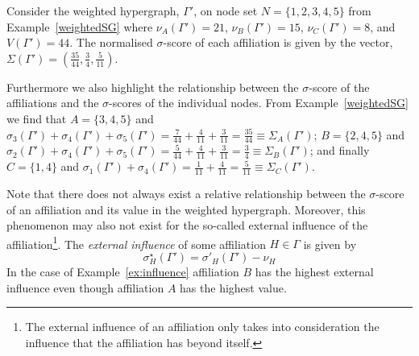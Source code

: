 \begin{example} \label{ex:influence}
Consider the weighted hypergraph, $\Gamma '$, on node set $N = \{ 1, 2, 3, 4, 5\}$ from Example~\ref{weightedSG} where $\nu_{A}(\Gamma' ) = 21$, $\nu_{B}(\Gamma' ) = 15$, $\nu_{C}(\Gamma' ) = 8$, and $V (\Gamma' ) = 44$. The normalised $\sigma$-score of each affiliation is given by the vector, $\Sigma(\Gamma' ) = ( \frac{35}{44}, \frac{3}{4}, \frac{5}{11} )$.

Furthermore we also highlight the relationship between the $\sigma$-score of the affiliations and the $\sigma$-scores of the individual nodes. From Example~\ref{weightedSG} we find that $A = \{3,4,5\}$ and $\sigma_{3}(\Gamma') + \sigma_{4}(\Gamma') + \sigma_{5}(\Gamma') = \frac{7}{44} + \frac{4}{11} + \frac{3}{11} = \frac{35}{44} \equiv \Sigma_{A}(\Gamma')$; $B = \{2,4,5\}$ and $\sigma_{2}(\Gamma') + \sigma_{4}(\Gamma') + \sigma_{5}(\Gamma') = \frac{5}{44} + \frac{4}{11} + \frac{3}{11} = \frac{3}{4} \equiv \Sigma_{B}(\Gamma')$; and finally $C = \{1,4\}$ and $\sigma_{1}(\Gamma') + \sigma_{4}(\Gamma') = \frac{1}{11} + \frac{4}{11} = \frac{5}{11} \equiv \Sigma_{C}(\Gamma')$.
\end{example}

Note that there does not always exist a relative relationship between the $\sigma$-score of an affiliation and its value in the weighted hypergraph. Moreover, this phenomenon may also not exist for the so-called external influence of the affiliation\footnote{The external influence of an affiliation only takes into consideration the influence that the affiliation has beyond itself.}. The \emph{external influence} of some affiliation $H \in \Gamma$ is given by
\begin{equation}
\sigma^{\star}_{H}(\Gamma' ) = \sigma'_{H}(\Gamma' ) - \nu_{H}
\end{equation}
In the case of Example~\ref{ex:influence} affiliation $B$ has the highest external influence even though affiliation $A$ has the highest value.

